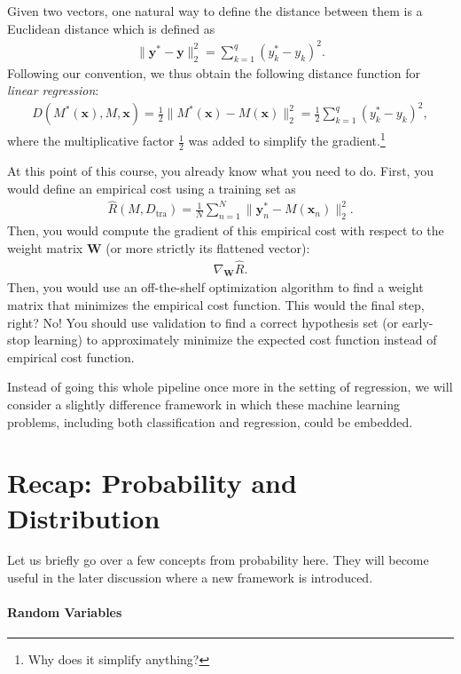 \documentclass{report}
\newcommand{\vect}[1]{\mathbf{#1}}
\newcommand{\matr}[1]{\mathbf{#1}}
\newcommand{\vx}[0]{\vect{x}}
\newcommand{\vy}[0]{\vect{y}}
\newcommand{\mW}[0]{\matr{W}}
\newcommand{\tra}{\text{tra}}
\begin{document}
Given two vectors, one natural way to define the distance between them is a
Euclidean distance which is defined as
\begin{align*}
    \|\vy^* - \vy\|_2^2 = \sum_{k=1}^q (y^*_k - y_k)^2.
\end{align*}
Following our convention, we thus obtain the following distance function for
{\it linear regression}:
\begin{align}
    \label{eq:linreg_dist}
    D(M^*(\vx), M, \vx) = \frac{1}{2} \|M^*(\vx) - M(\vx)\|_2^2 = 
    \frac{1}{2} \sum_{k=1}^q (y^*_k - y_k)^2,
\end{align}
where the multiplicative factor $\frac{1}{2}$ was added to simplify the
gradient.\footnote{
    Why does it simplify anything?
}

At this point of this course, you already know what you need to do. First, you
would define an empirical cost using a training set as
\begin{align*}
    \hat{R}(M, D_{\tra}) = \frac{1}{N} \sum_{n=1}^N
    \|\vy^*_n - M(\vx_n)\|^2_2.
\end{align*}
Then, you would compute the gradient of this empirical cost with respect to the
weight matrix $\mW$ (or more strictly its flattened vector):
\begin{align*}
    \nabla_{\mW} \hat{R}.
\end{align*}
Then, you would use an off-the-shelf optimization algorithm to find a weight
matrix that minimizes the empirical cost function. This would the final step,
right? No! You should use validation to find a correct hypothesis set (or
early-stop learning) to approximately minimize the expected cost function
instead of empirical cost function.

Instead of going this whole pipeline once more in the setting of regression, we
will consider a slightly difference framework in which these machine learning
problems, including both classification and regression, could be embedded. 

\section{Recap: Probability and Distribution}

Let us briefly go over a few concepts from probability here. They will become
useful in the later discussion where a new framework is introduced. 

\paragraph{Random Variables}
\end{document}
